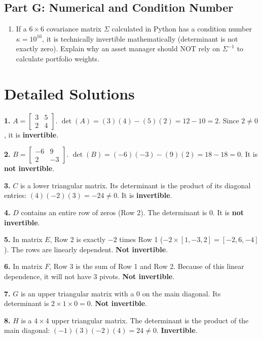 \documentclass[12pt]{article}
\begin{document}
\subsection*{Part G: Numerical and Condition Number}
\begin{enumerate}[label=\textbf{\arabic*.}, resume]
    \item If a $6 \times 6$ covariance matrix $\Sigma$ calculated in Python has a condition number $\kappa = 10^{16}$, it is technically invertible mathematically (determinant is not exactly zero). Explain why an asset manager should NOT rely on $\Sigma^{-1}$ to calculate portfolio weights.
\end{enumerate}

\newpage

\section{Detailed Solutions}
\label{sec:solutions}

\textbf{1.} $A = \begin{bmatrix} 3 & 5 \\ 2 & 4 \end{bmatrix}$. $\det(A) = (3)(4) - (5)(2) = 12 - 10 = 2$. Since $2 \neq 0$, it is \textbf{invertible}.

\textbf{2.} $B = \begin{bmatrix} -6 & 9 \\ 2 & -3 \end{bmatrix}$. $\det(B) = (-6)(-3) - (9)(2) = 18 - 18 = 0$. It is \textbf{not invertible}.

\textbf{3.} $C$ is a lower triangular matrix. Its determinant is the product of its diagonal entries: $(4)(-2)(3) = -24 \neq 0$. It is \textbf{invertible}.

\textbf{4.} $D$ contains an entire row of zeros (Row 2). The determinant is 0. It is \textbf{not invertible}.

\textbf{5.} In matrix $E$, Row 2 is exactly $-2$ times Row 1 ($-2 \times [1, -3, 2] = [-2, 6, -4]$). The rows are linearly dependent. \textbf{Not invertible}.

\textbf{6.} In matrix $F$, Row 3 is the sum of Row 1 and Row 2. Because of this linear dependence, it will not have 3 pivots. \textbf{Not invertible}.

\textbf{7.} $G$ is an upper triangular matrix with a 0 on the main diagonal. Its determinant is $2 \times 1 \times 0 = 0$. \textbf{Not invertible}.

\textbf{8.} $H$ is a $4 \times 4$ upper triangular matrix. The determinant is the product of the main diagonal: $(-1)(3)(-2)(4) = 24 \neq 0$. \textbf{Invertible}.
\end{document}
